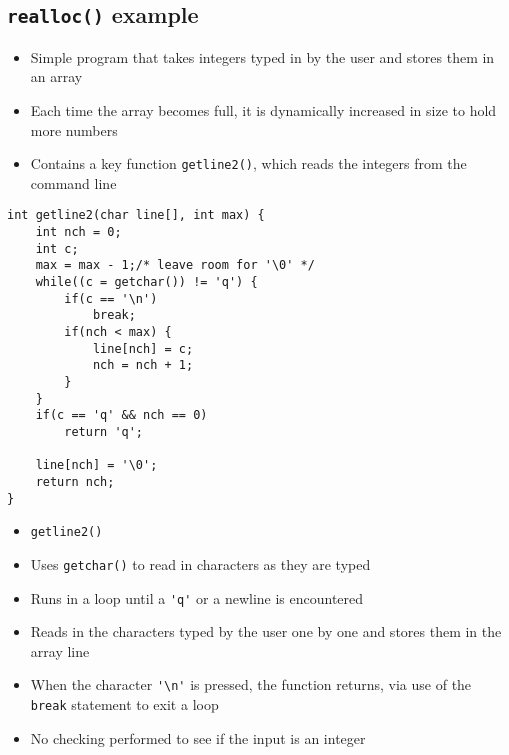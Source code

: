 \documentclass{article}
\begin{document}
\subsection{\texttt{realloc()} example}
\begin{itemize}
\item Simple program that takes integers typed in by the user and stores them in an array

\item Each time the array becomes full, it is dynamically increased in size to hold more numbers

\item Contains a key function \verb!getline2()!, which reads the integers from the command line
\end{itemize}



\begin{verbatim}
int getline2(char line[], int max) {
    int nch = 0;
    int c;
    max = max - 1;/* leave room for '\0' */
    while((c = getchar()) != 'q') {
        if(c == '\n')
            break;
        if(nch < max) {
            line[nch] = c;
            nch = nch + 1;
        }
    }
    if(c == 'q' && nch == 0)
        return 'q';
    
    line[nch] = '\0';
    return nch;
}
\end{verbatim}


\begin{itemize}
\item \verb!getline2()!

\item Uses \verb!getchar()! to read in characters as they are typed

\item Runs in a loop until a \verb!'q'! or a newline is encountered

\item Reads in the characters typed by the user one by one and stores them in the array line

\item When the character \verb!'\n'! is pressed, the function returns, via use of the \verb!break! statement to exit a loop

\item No checking performed to see if the input is an integer
\end{itemize}
\end{document}
